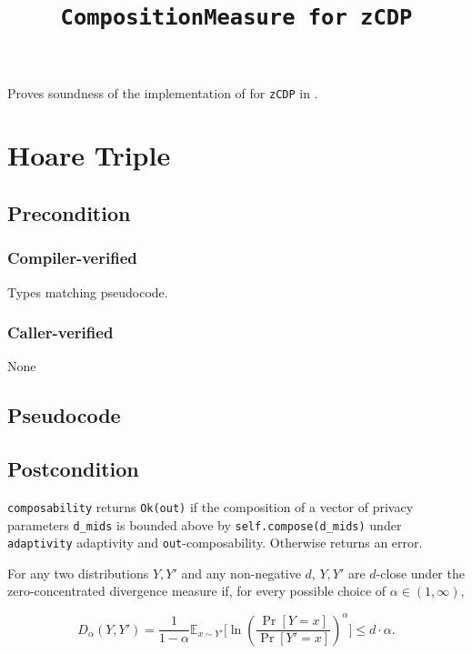 \documentclass{article}
\title{\texttt{CompositionMeasure for zCDP}}
\author{\MichaelShoemateAuthor}
\date{}
\begin{document}
\maketitle

\contrib
Proves soundness of the implementation of  
for \texttt{zCDP} in .

\section{Hoare Triple}
\subsection*{Precondition}
\subsubsection*{Compiler-verified}
Types matching pseudocode.


\subsubsection*{Caller-verified}
None

\subsection*{Pseudocode}


\subsection*{Postcondition}
\begin{theorem}
  \texttt{composability} returns \texttt{Ok(out)} if the composition of a vector of privacy parameters \texttt{d\_mids} 
  is bounded above by \texttt{self.compose(d\_mids)} under \texttt{adaptivity} adaptivity and \texttt{out}-composability.
  Otherwise returns an error.
\end{theorem}

\begin{definition}
  \label{def:zc-div}
  For any two distributions $Y, Y'$ and any non-negative $d$,
  $Y, Y'$ are $d$-close under the zero-concentrated divergence measure if,
  for every possible choice of $\alpha \in (1, \infty)$,

  \begin{equation}
    D_\alpha(Y, Y') = \frac{1}{1 - \alpha} \mathbb{E}_{x \sim Y'} \Big[\ln \left( \dfrac{\Pr[Y = x]}{\Pr[Y' = x]} \right)^\alpha \Big] \leq d \cdot \alpha.
  \end{equation}
\end{definition}
\end{document}
